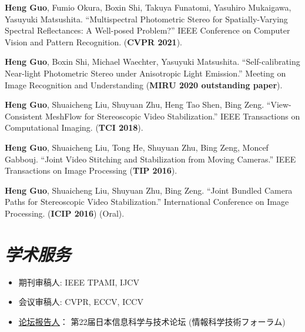 \documentclass[UTF8]{ctexart}
\begin{document}
\begin{enumerate}[label={[\arabic*]}]
		\item \textbf{Heng Guo}, Fumio Okura, Boxin Shi, Takuya Funatomi, Yasuhiro Mukaigawa, Yasuyuki Matsushita. ``Multispectral Photometric Stereo for Spatially-Varying Spectral Reflectances: A Well-posed Problem?'' IEEE Conference on Computer Vision and Pattern Recognition. (\textbf{CVPR 2021}). 
		\item \textbf{Heng Guo}, Boxin Shi, Michael Waechter, Yasuyuki Matsushita. ``Self-calibrating Near-light Photometric Stereo under Anisotropic Light Emission.'' Meeting on Image Recognition and Understanding (\textbf{MIRU 2020 outstanding paper}).  
		\item \textbf{Heng Guo}, Shuaicheng Liu, Shuyuan Zhu, Heng Tao Shen, Bing Zeng. ``View-Consistent MeshFlow for Stereoscopic Video Stabilization.'' IEEE Transactions on Computational Imaging. (\textbf{TCI 2018}).
		\item \textbf{Heng Guo}, Shuaicheng Liu, Tong He, Shuyuan Zhu, Bing Zeng, Moncef Gabbouj. ``Joint Video Stitching and Stabilization from Moving Cameras.'' IEEE Transactions on Image Processing (\textbf{TIP 2016}).
		\item \textbf{Heng Guo}, Shuaicheng Liu, Shuyuan Zhu, Bing Zeng. ``Joint Bundled Camera Paths for Stereoscopic Video Stabilization.'' International Conference on Image Processing. (\textbf{ICIP 2016}) (Oral).

	\end{enumerate}
	
	

	
	
	\section{\textit{\textbf{学术服务}}}
	\begin{itemize}
		\item 期刊审稿人: IEEE TPAMI, IJCV
		\item 会议审稿人: CVPR, ECCV, ICCV
		\item \href{https://gakkai-web.net/fit/program_web/event_TCS4-2.html}{\underline{论坛报告人}}： 第22届日本信息科学与技术论坛 (情報科学技術フォーラム) 
	\end{itemize}
\end{document}
